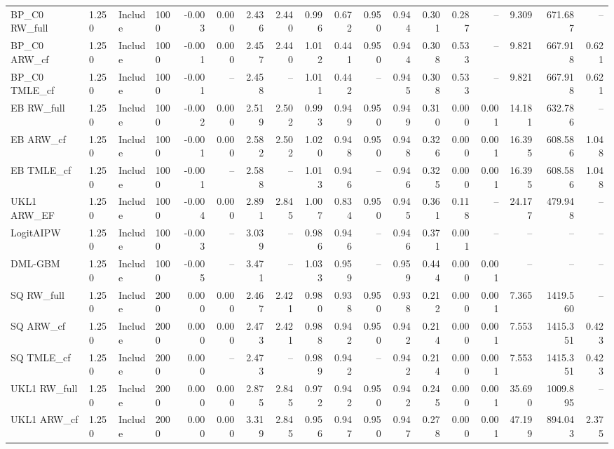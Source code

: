 \begin{tabular}{llllrrrrrrrrrrrrrr}
BP\_C0 RW\_full & 1.250 & Include & 1000 & -0.003 & 0.000 & 2.436 & 2.440 & 0.996 & 0.672 & 0.950 & 0.944 & 0.301 & 0.287 & -- & 9.309 & 671.687 & -- \\
BP\_C0 ARW\_cf & 1.250 & Include & 1000 & -0.001 & 0.000 & 2.457 & 2.440 & 1.012 & 0.441 & 0.950 & 0.944 & 0.308 & 0.533 & -- & 9.821 & 667.918 & 0.621 \\
BP\_C0 TMLE\_cf & 1.250 & Include & 1000 & -0.001 & -- & 2.458 & -- & 1.011 & 0.442 & -- & 0.945 & 0.308 & 0.533 & -- & 9.821 & 667.918 & 0.621 \\
EB RW\_full & 1.250 & Include & 1000 & -0.002 & 0.000 & 2.519 & 2.502 & 0.993 & 0.949 & 0.950 & 0.949 & 0.310 & 0.000 & 0.001 & 14.181 & 632.786 & -- \\
EB ARW\_cf & 1.250 & Include & 1000 & -0.001 & 0.000 & 2.582 & 2.502 & 1.020 & 0.948 & 0.950 & 0.948 & 0.326 & 0.000 & 0.001 & 16.395 & 608.586 & 1.048 \\
EB TMLE\_cf & 1.250 & Include & 1000 & -0.001 & -- & 2.588 & -- & 1.013 & 0.946 & -- & 0.946 & 0.325 & 0.000 & 0.001 & 16.395 & 608.586 & 1.048 \\
UKL1 ARW\_EF & 1.250 & Include & 1000 & -0.004 & 0.000 & 2.891 & 2.845 & 1.007 & 0.834 & 0.950 & 0.945 & 0.361 & 0.118 & -- & 24.177 & 479.948 & -- \\
LogitAIPW & 1.250 & Include & 1000 & -0.003 & -- & 3.039 & -- & 0.986 & 0.946 & -- & 0.946 & 0.371 & 0.001 & -- & -- & -- & -- \\
DML-GBM & 1.250 & Include & 1000 & -0.005 & -- & 3.471 & -- & 1.033 & 0.959 & -- & 0.959 & 0.444 & 0.000 & 0.001 & -- & -- & -- \\
SQ RW\_full & 1.250 & Include & 2000 & 0.000 & 0.000 & 2.467 & 2.421 & 0.980 & 0.938 & 0.950 & 0.938 & 0.212 & 0.000 & 0.001 & 7.365 & 1419.560 & -- \\
SQ ARW\_cf & 1.250 & Include & 2000 & 0.000 & 0.000 & 2.473 & 2.421 & 0.988 & 0.942 & 0.950 & 0.942 & 0.214 & 0.000 & 0.001 & 7.553 & 1415.351 & 0.423 \\
SQ TMLE\_cf & 1.250 & Include & 2000 & 0.000 & -- & 2.473 & -- & 0.989 & 0.942 & -- & 0.942 & 0.214 & 0.000 & 0.001 & 7.553 & 1415.351 & 0.423 \\
UKL1 RW\_full & 1.250 & Include & 2000 & 0.000 & 0.000 & 2.875 & 2.845 & 0.972 & 0.942 & 0.950 & 0.942 & 0.245 & 0.000 & 0.001 & 35.690 & 1009.895 & -- \\
UKL1 ARW\_cf & 1.250 & Include & 2000 & 0.000 & 0.000 & 3.319 & 2.845 & 0.956 & 0.947 & 0.950 & 0.947 & 0.278 & 0.000 & 0.001 & 47.199 & 894.043 & 2.375 \\

\end{tabular}
